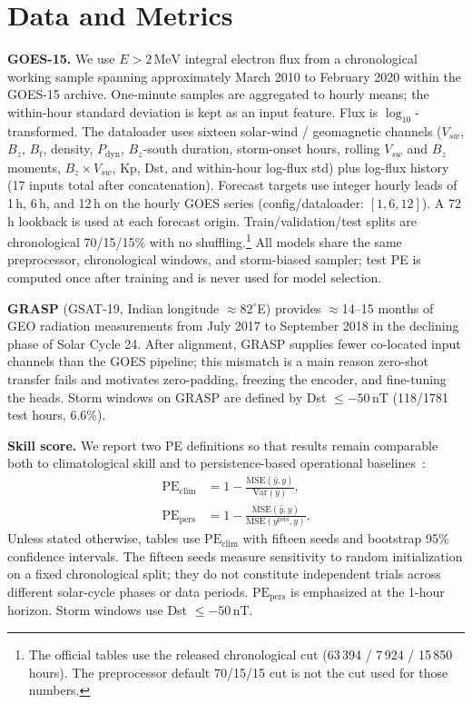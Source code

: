 \documentclass[conference]{IEEEtran}
\begin{document}
\section{Data and Metrics}
\textbf{GOES-15.} We use \(E>2\,\mathrm{MeV}\) integral electron flux from a
chronological working sample spanning approximately March 2010 to February 2020
within the GOES-15 archive. One-minute samples are aggregated to hourly means;
the within-hour standard deviation is kept as an input feature. Flux is
\(\log_{10}\)-transformed. The dataloader uses sixteen solar-wind /
geomagnetic channels
(\(V_{sw}\), \(B_z\), \(B_t\), density, \(P_{\mathrm{dyn}}\),
\(B_z\)-south duration, storm-onset hours, rolling \(V_{sw}\) and \(B_z\)
moments, \(B_z\times V_{sw}\), Kp, Dst, and within-hour log-flux std)
plus log-flux history (17 inputs total after concatenation). Forecast targets use integer hourly leads of 1\,h, 6\,h, and 12\,h on the hourly GOES series (config/dataloader: $[1,6,12]$). A 72\,h lookback is used at
each forecast origin. Train/validation/test splits are chronological
70/15/15\% with no shuffling.\footnote{The official tables use the released chronological cut (63\,394 / 7\,924 / 15\,850 hours). The preprocessor default 70/15/15 cut is not the cut used for those numbers.} All models share the same preprocessor, chronological windows, and storm-biased sampler; test PE is computed once after training and is never used for model selection.

\textbf{GRASP} (GSAT-19, Indian longitude \(\approx82^\circ\)E) provides
$\approx$14--15 months of GEO radiation measurements from July 2017 to September 2018 in
the declining phase of Solar Cycle 24. After alignment, GRASP supplies fewer
co-located input channels than the GOES pipeline; this mismatch is a main
reason zero-shot transfer fails and motivates
zero-padding, freezing the encoder, and fine-tuning the heads.
Storm windows on GRASP are defined by Dst \(\le -50\,\mathrm{nT}\)
(118/1781 test hours, 6.6\%).

\textbf{Skill score.} We report two PE definitions so that results remain comparable both to climatological skill and to persistence-based operational baselines~\cite{b12}:
\begin{align}
\mathrm{PE}_{\mathrm{clim}} &= 1 - \frac{\mathrm{MSE}(\hat y,y)}{\mathrm{Var}(y)}, \\
\mathrm{PE}_{\mathrm{pers}} &= 1 - \frac{\mathrm{MSE}(\hat y,y)}{\mathrm{MSE}(y^{\mathrm{pers}},y)}.
\end{align}
Unless stated otherwise, tables use \(\mathrm{PE}_{\mathrm{clim}}\) with fifteen seeds and bootstrap 95\% confidence intervals. The fifteen seeds measure sensitivity to random initialization on a fixed chronological split; they do not constitute independent trials across different solar-cycle phases or data periods. \(\mathrm{PE}_{\mathrm{pers}}\) is emphasized at the 1-hour horizon. Storm windows use Dst \(\le -50\,\mathrm{nT}\).
\end{document}
